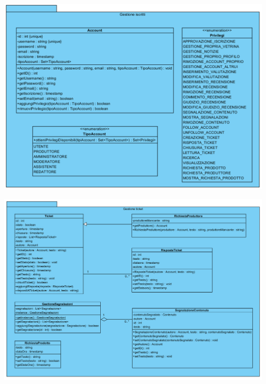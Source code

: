 \begin{center}
			\includegraphics[width=\textwidth]{assets/visualParadigm/classi/GestioneIscritti}
\end{center}

\begin{center}
			\includegraphics[width=\textwidth]{assets/visualParadigm/classi/GestioneTicket}
\end{center}

